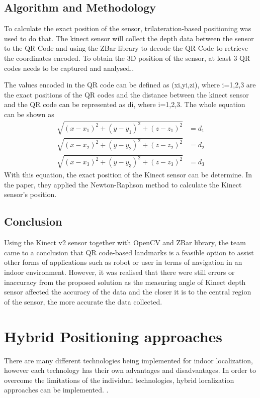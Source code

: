\documentclass{l4proj}
\begin{document}
\subsection{Algorithm and Methodology}
To calculate the exact position of the sensor, trilateration-based positioning was used to do that. The kinect sensor will collect the depth data between the sensor to the QR Code and using the ZBar library to decode the QR Code to retrieve the coordinates encoded. To obtain the 3D position of the sensor, at least 3 QR codes needs to be captured and analysed.\cite{3d}.

The values encoded in the QR code can be defined as (xi,yi,zi), where i=1,2,3 are the exact positions of the QR codes and the distance between the kinect sensor and the QR code can be represented as  di, where i=1,2,3. The whole equation can be shown as
\begin{align*} \sqrt{(x-x_{1})^{2}+(y-y_{1})^{2}+(z-z_{1})^{2}} &= d_{1} \\ \sqrt{(x-x_{2})^{2}+(y-y_{2})^{2}+(z-z_{2})^{2}} &= d_{2} \\ \sqrt{(x-x_{3})^{2}+(y-y_{3})^{2}+(z-z_{3})^{2}} &= d_{3} \end{align*}
With this equation, the exact position of the Kinect sensor can be determine. In the paper, they applied the Newton-Raphson method to calculate the Kinect sensor's position.

\subsection{Conclusion}
Using the Kinect v2 sensor together with OpenCV and ZBar library, the team came to a conclusion that QR code-based landmarks is a feasible option to assist other forms of applications such as robot or user in terms of navigation in an indoor environment. However, it was realised that there were still errors or inaccuracy from the proposed solution as the measuring angle of Kinect depth sensor affected the accuracy of the data and the closer it is to the central region of the sensor, the more accurate the data collected. \cite{qrconclusion}

\section{Hybrid Positioning approaches}
There are many different technologies being implemented for indoor localization, however each technology has their own advantages and disadvantages. In order to overcome the limitations of the individual technologies, hybrid localization approaches can be implemented. \cite[p.~114]{plie}\cite[p.~39-50]{wireless}. 
\end{document}
